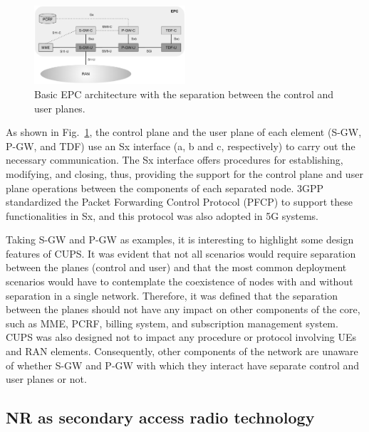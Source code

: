 \begin{figure}[htb]  
  \begin{center}
 \includegraphics[width=0.5\textwidth]{figs/CUPS.pdf}
   \end{center}
 \caption{Basic EPC architecture with the separation between the control and user planes.}
 \label{fig:cups}
 \end{figure}

As shown in Fig.~\ref{fig:cups}, the control plane and the user plane of each element (S-GW, P-GW, and TDF) use an Sx interface (a, b and c, respectively) to carry out the necessary communication. The Sx interface offers procedures for establishing, modifying, and closing, thus, providing the support for the control plane and user plane operations between the components of each separated node. 3GPP standardized the Packet Forwarding Control Protocol (PFCP) to support these functionalities in Sx, and this protocol was also adopted in 5G systems.

Taking S-GW and P-GW as examples, it is interesting to highlight some design features of CUPS. It was evident that not all scenarios would require separation between the planes (control and user) and that the most common deployment scenarios would have to contemplate the coexistence of nodes with and without separation in a single network. Therefore, it was defined that the separation between the planes should not have any impact on other components of the core, such as MME, PCRF, billing system, and subscription management system. CUPS was also designed not to impact any procedure or protocol involving UEs and RAN elements. Consequently, other components of the network are unaware of whether S-GW and P-GW with which they interact have separate control and user planes or not.


\subsection*{NR as secondary access radio technology}

